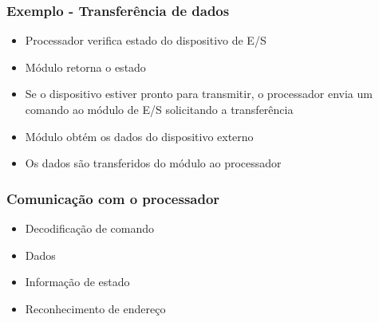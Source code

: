 \documentclass[aspectratio=169,
				xcolor=table]{beamer}
\begin{document}
	\begin{frame}
		\frametitle{Exemplo - Transferência de dados}
		\begin{itemize}
			\item Processador verifica estado do dispositivo de E/S
			\vspace{1em}
			\item Módulo retorna o estado
			\vspace{1em}
			\item Se o dispositivo estiver pronto para transmitir, o processador envia um comando ao módulo de E/S solicitando a transferência
			\vspace{1em}
			\item Módulo obtém os dados do dispositivo externo
			\vspace{1em}
			\item Os dados são transferidos do módulo ao processador
		\end{itemize}
	\end{frame}
	
	\begin{frame}
		\frametitle{Comunicação com o processador}
		\begin{itemize}
			\item Decodificação de comando
			\vspace{1em}
			\item Dados
			\vspace{1em}
			\item Informação de estado
			\vspace{1em}
			\item Reconhecimento de endereço
		\end{itemize}
	\end{frame}
	
\end{document}
